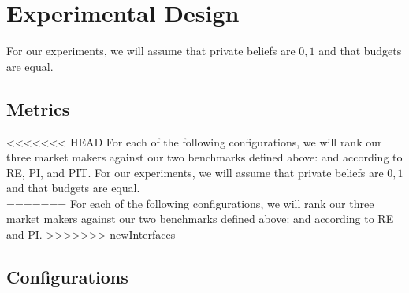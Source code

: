 \section{Experimental Design}
For our experiments, we will assume that private beliefs are ${0,1}$ and that budgets are equal.
\subsection{Metrics}
<<<<<<< HEAD
For each of the following configurations, we will rank our three market makers against our two benchmarks defined above:  and  according to RE, PI, and PIT. For our experiments, we will assume that private beliefs are ${0,1}$ and that budgets are equal.\\
=======
For each of the following configurations, we will rank our three market makers against our two benchmarks defined above:  and  according to RE and PI.
>>>>>>> newInterfaces

\subsection{Configurations}
